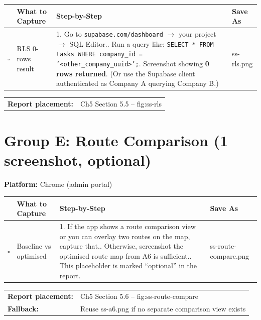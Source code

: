 \documentclass[11pt,a4paper]{article}
\newcommand{\checkbox}{$\square$\;}
\newcommand{\filesave}[1]{{\ttfamily\small #1}}
\begin{document}
\begin{longtable}{@{}p{0.4cm} p{2.8cm} p{6.2cm} p{3.5cm}@{}}
  \toprule
  & \textbf{What to Capture} & \textbf{Step-by-Step} & \textbf{Save As} \\
  \midrule
  \checkbox & RLS 0-rows result &
    1. Go to \texttt{supabase.com/dashboard} $\to$ your project $\to$ SQL Editor.\newline
    2. Run a query like:\newline
    \texttt{SELECT * FROM tasks WHERE company\_id = '<other\_company\_uuid>';}\newline
    3. Screenshot showing \textbf{0 rows returned}.\newline
    (Or use the Supabase client authenticated as Company A querying Company B.) &
    \filesave{ss-rls.png} \\
  \bottomrule
\end{longtable}

\medskip
\begin{tabular}{@{}ll@{}}
  \textbf{Report placement:} & Ch5 Section 5.5 -- fig:ss-rls \\
\end{tabular}

\section{Group E: Route Comparison (1 screenshot, optional)}

\textbf{Platform:} Chrome (admin portal)

\begin{longtable}{@{}p{0.4cm} p{2.8cm} p{6.2cm} p{3.5cm}@{}}
  \toprule
  & \textbf{What to Capture} & \textbf{Step-by-Step} & \textbf{Save As} \\
  \midrule
  \checkbox & Baseline vs optimised &
    1. If the app shows a route comparison view or you can overlay two routes on the map, capture that.\newline
    2. Otherwise, screenshot the optimised route map from A6 is sufficient.\newline
    3. This placeholder is marked ``optional'' in the report. &
    \filesave{ss-route-compare.png} \\
  \bottomrule
\end{longtable}

\medskip
\begin{tabular}{@{}ll@{}}
  \textbf{Report placement:} & Ch5 Section 5.6 -- fig:ss-route-compare \\
  \textbf{Fallback:}         & Reuse \filesave{ss-a6.png} if no separate comparison view exists \\
\end{tabular}
\end{document}
